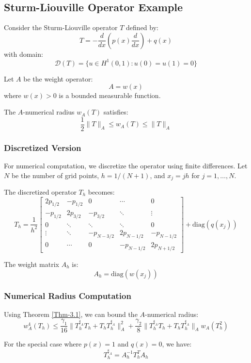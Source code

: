 \documentclass{article}
\begin{document}

\subsection{Sturm-Liouville Operator Example}\hfill

Consider the Sturm-Liouville operator $T$ defined by:
\[ T = -\frac{d}{dx}\left(p(x)\frac{d}{dx}\right) + q(x) \]
with domain:
\[ \mathcal{D}(T) = \{ u \in H^1(0,1) : u(0) = u(1) = 0 \} \]

Let $A$ be the weight operator:
\[ A = w(x) \]
where $w(x) > 0$ is a bounded measurable function.

The $A$-numerical radius $w_A(T)$ satisfies:
\[ \frac{1}{2}\|T\|_A \leq w_A(T) \leq \|T\|_A \]

\subsubsection{Discretized Version}

For numerical computation, we discretize the operator using finite differences. Let $N$ be the number of grid points, $h = 1/(N+1)$, and $x_j = jh$ for $j=1,\ldots,N$.

The discretized operator $T_h$ becomes:
\[ T_h = \frac{1}{h^2}\begin{bmatrix}
2p_{1/2} & -p_{1/2} & 0 & \cdots & 0 \\
-p_{1/2} & 2p_{3/2} & -p_{3/2} & \ddots & \vdots \\
0 & \ddots & \ddots & \ddots & 0 \\
\vdots & \ddots & -p_{N-3/2} & 2p_{N-1/2} & -p_{N-1/2} \\
0 & \cdots & 0 & -p_{N-1/2} & 2p_{N+1/2}
\end{bmatrix} + \mathrm{diag}(q(x_j)) \]

The weight matrix $A_h$ is:
\[ A_h = \mathrm{diag}(w(x_j)) \]

\subsubsection{Numerical Radius Computation}

Using Theorem \ref{Thm-3.1}, we can bound the $A$-numerical radius:
\[ w_A^4(T_h) \leq \frac{\gamma_1}{16}\|T_h^{\sharp_A} T_h + T_h T_h^{\sharp_A}\|_A^2 + \frac{\gamma_2}{8}\|T_h^{\sharp_A} T_h + T_h T_h^{\sharp_A}\|_A w_A(T_h^2) \]

For the special case where $p(x) = 1$ and $q(x) = 0$, we have:
\[ T_h^{\sharp_A} = A_h^{-1} T_h^T A_h \]
\end{document}
